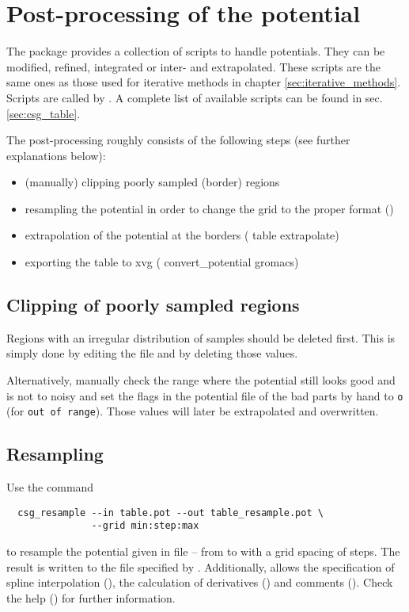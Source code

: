 \section{Post-processing of the potential}
\label{sec:post_processing}
The \votca package provides a collection of scripts to handle potentials. They can be modified, refined, integrated or inter- and extrapolated. These scripts are the same ones as those used for iterative methods in chapter \ref{sec:iterative_methods}. Scripts are called by . A complete list of available scripts can be found in sec. \ref{sec:csg_table}.

The post-processing roughly consists of the following steps (see further explanations below):
\begin{itemize}
  \item (manually) clipping poorly sampled (border) regions
  \item resampling the potential in order to change the grid to the proper format ()
  \item extrapolation of the potential at the borders ( table extrapolate)
  \item exporting the table to xvg ( convert\_potential gromacs)
\end{itemize}

\subsection{Clipping of poorly sampled regions}
Regions with an irregular distribution of samples should be deleted first. This is simply done by editing the  file and by deleting those values.

Alternatively, manually check the range where the potential still looks good and is not to noisy and set the flags in the potential file of the bad parts by hand to \texttt{o} (for \texttt{out of range}). Those values will later be extrapolated and overwritten.

\subsection{Resampling}
Use the command
\begin{verbatim}
  csg_resample --in table.pot --out table_resample.pot \
               --grid min:step:max
\end{verbatim}
to resample the potential given in file -- from  to  with a grid spacing of  steps. The result is written to the file specified by . Additionally,  allows the specification of spline interpolation (), the calculation of derivatives () and comments (). Check the help () for further information.

